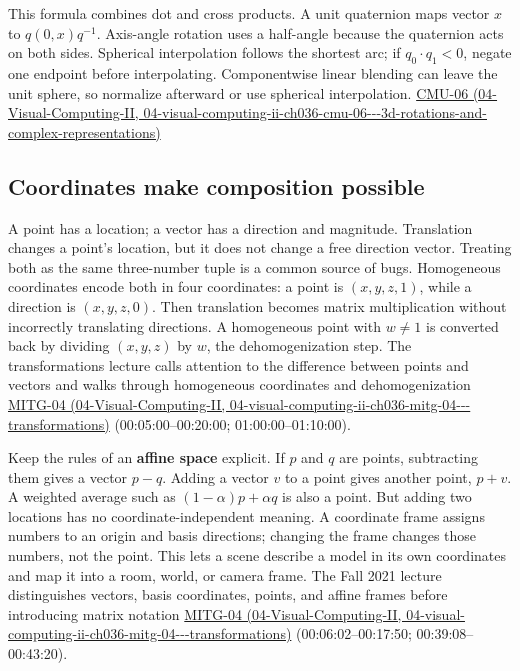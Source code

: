 This formula combines dot and cross products. A unit quaternion maps vector \(x\) to \(q(0,x)q^{-1}\). Axis-angle rotation uses a half-angle because the quaternion acts on both sides. Spherical interpolation follows the shortest arc; if \(q_0\cdot q_1<0\), negate one endpoint before interpolating. Componentwise linear blending can leave the unit sphere, so normalize afterward or use spherical interpolation. \href{../04-Visual-Computing-II/main.pdf\#nameddest=04-visual-computing-ii-ch036-cmu-06---3d-rotations-and-complex-representations}{CMU-06 (04-Visual-Computing-II, 04-visual-computing-ii-ch036-cmu-06-\/-\/-3d-rotations-and-complex-representations)}

\subsection{Coordinates make composition possible}\label{03-visual-computing-i-ch001-coordinates-make-composition-possible}

A point has a location; a vector has a direction and magnitude. Translation changes a point's location, but it does not change a free direction vector. Treating both as the same three-number tuple is a common source of bugs. Homogeneous coordinates encode both in four coordinates: a point is \((x,y,z,1)\), while a direction is \((x,y,z,0)\). Then translation becomes matrix multiplication without incorrectly translating directions. A homogeneous point with \(w\ne 1\) is converted back by dividing \((x,y,z)\) by \(w\), the dehomogenization step. The transformations lecture calls attention to the difference between points and vectors and walks through homogeneous coordinates and dehomogenization \href{../04-Visual-Computing-II/main.pdf\#nameddest=04-visual-computing-ii-ch036-mitg-04---transformations}{MITG-04 (04-Visual-Computing-II, 04-visual-computing-ii-ch036-mitg-04-\/-\/-transformations)} (00:05:00--00:20:00; 01:00:00--01:10:00).

Keep the rules of an \textbf{affine space} explicit. If \(p\) and \(q\) are points, subtracting them gives a vector \(p-q\). Adding a vector \(v\) to a point gives another point, \(p+v\). A weighted average such as \((1-\alpha)p+\alpha q\) is also a point. But adding two locations has no coordinate-independent meaning. A coordinate frame assigns numbers to an origin and basis directions; changing the frame changes those numbers, not the point. This lets a scene describe a model in its own coordinates and map it into a room, world, or camera frame. The Fall 2021 lecture distinguishes vectors, basis coordinates, points, and affine frames before introducing matrix notation \href{../04-Visual-Computing-II/main.pdf\#nameddest=04-visual-computing-ii-ch036-mitg-04---transformations}{MITG-04 (04-Visual-Computing-II, 04-visual-computing-ii-ch036-mitg-04-\/-\/-transformations)} (00:06:02--00:17:50; 00:39:08--00:43:20).

